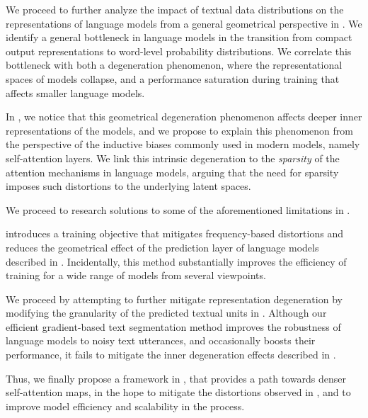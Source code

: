 We proceed to further analyze the impact of textual data distributions on the representations of language models from a general geometrical perspective in . We identify a general bottleneck in language models in the transition from compact output representations to word-level probability distributions. We correlate this bottleneck with both a degeneration phenomenon, where the representational spaces of models collapse, and a performance saturation during training that affects smaller language models.

In , we notice that this geometrical degeneration phenomenon affects deeper inner representations of the models, and we propose to explain this phenomenon from the perspective of the inductive biases commonly used in modern models, namely self-attention layers. We link this intrinsic degeneration to the \textit{sparsity} of the attention mechanisms in language models, arguing that the need for sparsity imposes such distortions to the underlying latent spaces.

We proceed to research solutions to some of the aforementioned limitations in . 

 introduces a training objective that mitigates frequency-based distortions and reduces the geometrical effect of the prediction layer of language models described in . Incidentally, this method substantially improves the efficiency of training for a wide range of models from several viewpoints.

We proceed by attempting to further mitigate representation degeneration by modifying the granularity of the predicted textual units in . Although our efficient gradient-based text segmentation method improves the robustness of language models to noisy text utterances, and occasionally boosts their performance, it fails to mitigate the inner degeneration effects described in .

Thus, we finally propose a framework in , that provides a path towards denser self-attention maps, in the hope to mitigate the distortions observed in , and to improve model efficiency and scalability in the process.


